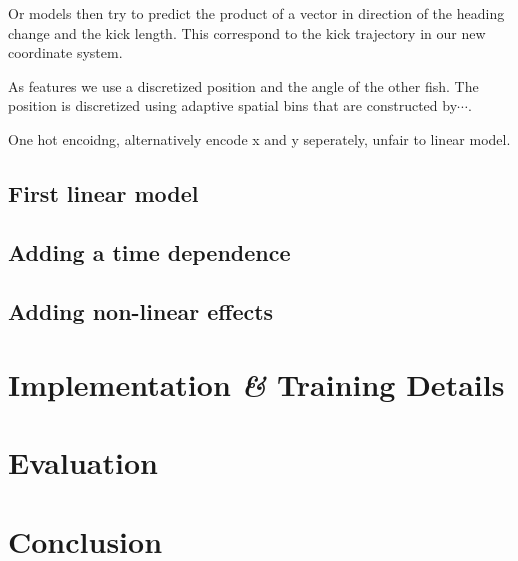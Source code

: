 \documentclass[nobib]{tufte-handout}
\begin{document}
Or models then try to predict the product of a vector in direction of the heading change and the kick length.
This correspond to the kick trajectory in our new coordinate system.

As features we use a discretized position and the angle of the other fish.
The position is discretized using adaptive spatial bins that are constructed by\(\cdots\).


One hot encoidng, alternatively encode x and y seperately, unfair to linear model.

\subsection{First linear model}

\subsection{Adding a time dependence}

\subsection{Adding non-linear effects}

\section{Implementation \textit{\&} Training Details}

\section{Evaluation}

\section{Conclusion}
\end{document}
